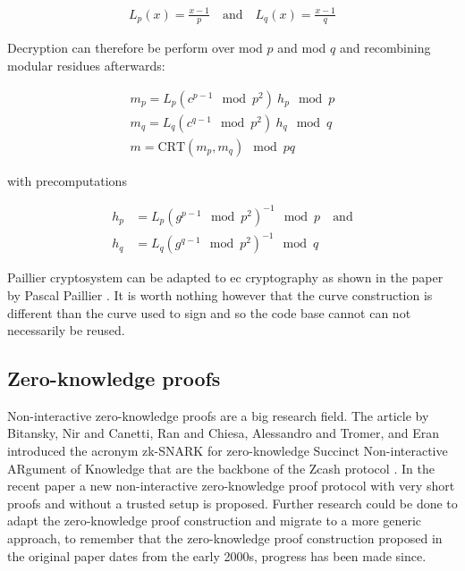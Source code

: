 \begin{ceqn}
\begin{align*}
  L_p(x) = \frac{x-1}{p} \quad \text{and} \quad L_q(x) = \frac{x-1}{q}
\end{align*}
\end{ceqn}

Decryption can therefore be perform over mod $p$ and mod $q$ and recombining
modular residues afterwards:

\begin{ceqn}
\begin{align*}
  m_p = L_p(c^{p-1} \mod p^2) \ h_p \mod p \\
  m_q = L_q(c^{q-1} \mod p^2) \ h_q \mod q \\
  m = \text{CRT}(m_p, m_q) \mod pq
\end{align*}
\end{ceqn}

with precomputations

\begin{ceqn}
\begin{align*}
  h_p &= L_p(g^{p-1} \mod p^2)^{-1} \mod p \quad \text{and} \\
  h_q &= L_q(g^{q-1} \mod p^2)^{-1} \mod q
\end{align*}
\end{ceqn}

Paillier cryptosystem can be adapted to \gls{ec} cryptography as shown in the
paper  by
Pascal Paillier \cite{10.1007/3-540-44448-3_44}. It is worth nothing however
that the curve construction is different than the curve used to sign and so
the code base cannot can not necessarily be reused.

\subsection{Zero-knowledge proofs}

Non-interactive zero-knowledge proofs are a big research field. The article
by Bitansky, Nir and Canetti, Ran and Chiesa, Alessandro and Tromer, and Eran
\cite{Bitansky:2012:ECR:2090236.2090263}
introduced the acronym zk-SNARK for zero-knowledge Succinct Non-interactive ARgument
of Knowledge that are the backbone of the Zcash protocol \cite{cryptoeprint:2014:349}.
In the recent paper 
\cite{cryptoeprint:2017:1066} a new non-interactive zero-knowledge proof
protocol with very short proofs and without a trusted setup is proposed.
Further research could be done to adapt the zero-knowledge proof construction
and migrate to a more generic approach, to remember that the zero-knowledge proof
construction proposed in the original paper dates from the early 2000s, progress
has been made since.


